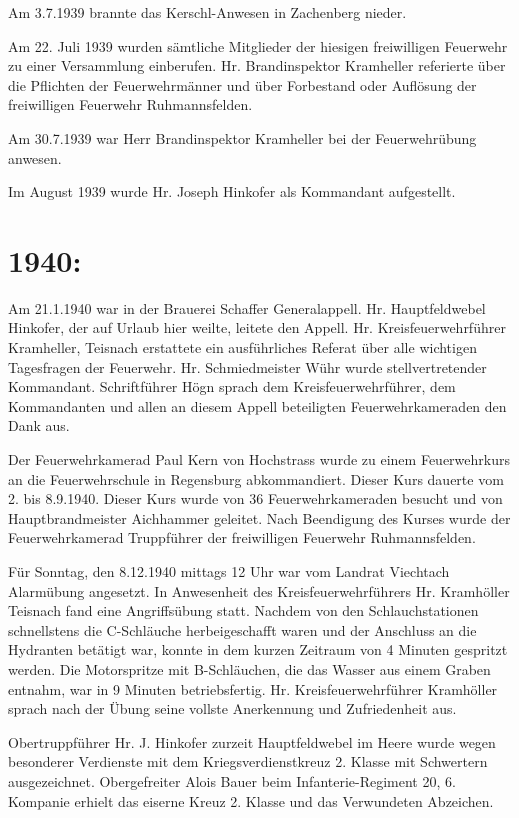\documentclass[12pt,a4paper]{book}
\begin{document}
Am 3.7.1939 brannte das Kerschl-Anwesen in Zachenberg nieder.

Am 22. Juli 1939 wurden sämtliche Mitglieder der hiesigen freiwilligen Feuerwehr
zu einer Versammlung einberufen. Hr. Brandinspektor Kramheller referierte über
die Pflichten der Feuerwehrmänner und über Forbestand oder Auflösung der
freiwilligen Feuerwehr Ruhmannsfelden.

Am 30.7.1939 war Herr Brandinspektor Kramheller bei der Feuerwehrübung anwesen.

Im August 1939 wurde Hr. Joseph Hinkofer als Kommandant aufgestellt.

\section{1940:}

Am 21.1.1940 war in der Brauerei Schaffer Generalappell. Hr. Hauptfeldwebel
Hinkofer, der auf Urlaub hier weilte, leitete den Appell. Hr.
Kreisfeuerwehrführer Kramheller, Teisnach erstattete ein ausführliches Referat
über alle wichtigen Tagesfragen der Feuerwehr. Hr. Schmiedmeister Wühr wurde
stellvertretender Kommandant. Schriftführer Högn sprach dem
Kreisfeuerwehrführer, dem Kommandanten und allen an diesem Appell beteiligten
Feuerwehrkameraden den Dank aus.

Der Feuerwehrkamerad Paul Kern von Hochstrass wurde zu einem Feuerwehrkurs an
die Feuerwehrschule in Regensburg abkommandiert. Dieser Kurs dauerte vom 2. bis
8.9.1940. Dieser Kurs wurde von 36 Feuerwehrkameraden besucht und von
Hauptbrandmeister Aichhammer geleitet. Nach Beendigung des Kurses wurde der
Feuerwehrkamerad Truppführer der freiwilligen Feuerwehr Ruhmannsfelden.

Für Sonntag, den 8.12.1940 mittags 12 Uhr war vom Landrat Viechtach Alarmübung
angesetzt. In Anwesenheit des Kreisfeuerwehrführers Hr. Kramhöller Teisnach fand
eine Angriffsübung statt. Nachdem von den Schlauchstationen schnellstens die
C-Schläuche herbeigeschafft waren und der Anschluss an die Hydranten betätigt
war, konnte in dem kurzen Zeitraum von 4 Minuten gespritzt werden. Die
Motorspritze mit B-Schläuchen, die das Wasser aus einem Graben entnahm, war in 9
Minuten betriebsfertig. Hr. Kreisfeuerwehrführer Kramhöller sprach nach der
Übung seine vollste Anerkennung und Zufriedenheit aus.

Obertruppführer Hr. J. Hinkofer zurzeit Hauptfeldwebel im Heere wurde wegen
besonderer Verdienste mit dem Kriegsverdienstkreuz 2. Klasse mit Schwertern
ausgezeichnet. Obergefreiter Alois Bauer beim Infanterie-Regiment 20, 6.
Kompanie erhielt das eiserne Kreuz 2. Klasse und das Verwundeten Abzeichen.
\end{document}
